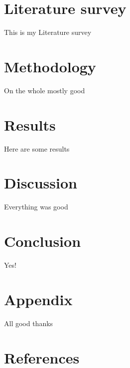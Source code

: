 \documentclass[12pt,a4paper]{article}
\begin{document}
\section{Literature survey}
\textcite[p.~2]{latex:guide}
This is my Literature survey

\section{Methodology}
On the whole mostly good

\section{Results}
Here are some results

\section{Discussion}
Everything was good

\section{Conclusion}
Yes!

\section{Appendix}
All good thanks

\clearpage

\section{References}
\printbibliography[heading=none]
\end{document}
